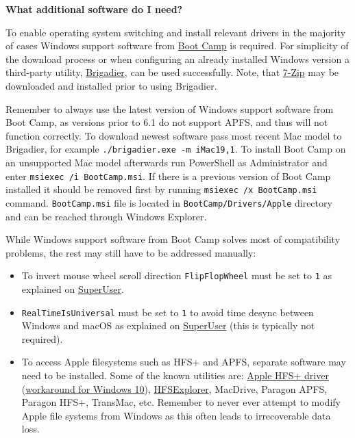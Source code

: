 \documentclass[]{article}
\begin{document}
  \textbf{What additional software do I need?}

  To enable operating system switching and install relevant drivers in the majority of
  cases Windows support software from
  \href{https://support.apple.com/boot-camp}{Boot Camp} is required. For simplicity of the download
  process or when configuring an already installed Windows version a third-party utility,
  \href{https://github.com/timsutton/brigadier}{Brigadier}, can be used successfully.
  Note, that \href{https://www.7-zip.org}{7-Zip} may be downloaded and installed
  prior to using Brigadier.

  Remember to always use the latest version of Windows support software from Boot Camp,
  as versions prior to 6.1 do not support APFS, and thus will not function correctly.
  To download newest software pass most recent Mac model to Brigadier, for example
  \texttt{./brigadier.exe -m iMac19,1}. To install Boot Camp on an unsupported Mac model
  afterwards run PowerShell as Administrator and enter \texttt{msiexec /i BootCamp.msi}.
  If there is a previous version of Boot Camp installed it should be
  removed first by running \texttt{msiexec /x BootCamp.msi} command. \texttt{BootCamp.msi}
  file is located in \texttt{BootCamp/Drivers/Apple} directory and can be reached through
  Windows Explorer.

  While Windows support software from Boot Camp solves most of compatibility problems,
  the rest may still have to be addressed manually:

  \begin{itemize}
  \item To invert mouse wheel scroll direction \texttt{FlipFlopWheel} must be set
  to \texttt{1} as explained on \href{https://superuser.com/a/364353}{SuperUser}.
  \item \texttt{RealTimeIsUniversal} must be set to \texttt{1} to avoid time
  desync between Windows and macOS as explained on
  \href{https://superuser.com/q/494432}{SuperUser} (this is typically not required).
  \item To access Apple filesystems such as HFS+ and APFS, separate software may need to
  be installed. Some of the known utilities are:
  \href{https://forums.macrumors.com/threads/apple-hfs-windows-driver-download.1368010/}{Apple HFS+ driver}
  (\href{https://forums.macrumors.com/threads/apple-hfs-windows-driver-download.1368010/post-24180079}{workaround for Windows 10}),
  \href{http://www.catacombae.org/hfsexplorer}{HFSExplorer}, MacDrive, Paragon APFS,
  Paragon HFS+, TransMac, etc. Remember to never ever attempt to modify Apple file systems
  from Windows as this often leads to irrecoverable data loss.
  \end{itemize}
\end{document}
